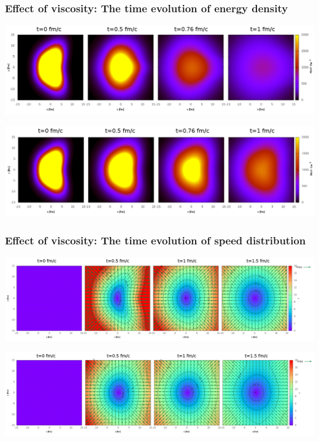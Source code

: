 \documentclass{beamer}
\begin{document}
\begin{frame}
\frametitle{Effect of viscosity: The time evolution of energy density}
\begin{minipage}{0.04\textwidth}
\end{minipage}
\begin{minipage}{0.95\textwidth}
\begin{center}
    \includegraphics[scale=0.19]{pic/res/nonrel/anim/ev0}

    \includegraphics[scale=0.19]{pic/res/nonrel/anim/ev10}
\end{center}
\end{minipage}
\end{frame}
\begin{frame}
\frametitle{Effect of viscosity:  The time evolution of speed distribution}
\begin{minipage}{0.04\textwidth}
\end{minipage}
\begin{minipage}{0.95\textwidth}
\begin{center}
    \includegraphics[scale=0.15]{pic/res/nonrel/anim/vv0}

    \includegraphics[scale=0.15]{pic/res/nonrel/anim/vv10}
\end{center}
\end{minipage}
\end{frame}
\end{document}
